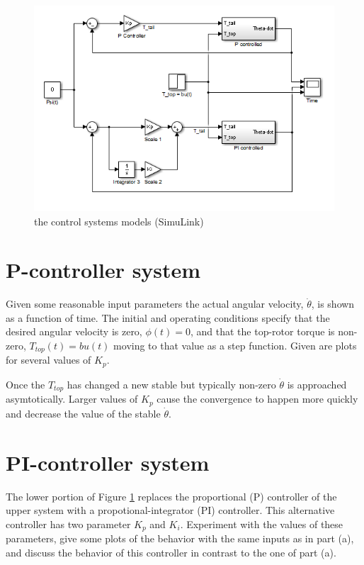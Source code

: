 \documentclass{article}
\begin{document}
\begin{figure}[h!]
\centering
\includegraphics[scale=0.8]{controller_model.png}
\caption{the control systems models (SimuLink)}
\label{fig:control_system}
\end{figure}

\section{P-controller system}

Given some reasonable input parameters the
actual angular velocity, $\dot{\theta}$, is shown
as a function of time.
The initial and operating conditions
specify that the desired angular velocity
is zero, $\phi (t) = 0$, and that the
top-rotor torque is non-zero,
$T_{top}(t) = b u(t)$ moving to that
value as a step function.
Given are plots for several values of $K_p$.


Once the $T_{top}$ has changed a new stable but
typically non-zero $\dot{\theta}$ is approached asymtotically.
Larger values of $K_p$ cause the convergence
to happen more quickly and decrease the value of
the stable $\dot{\theta}$.


\section{PI-controller system}
The lower portion of Figure \ref{fig:control_system}
replaces the proportional (P) controller of the upper system
with a propotional-integrator (PI) controller.
This alternative controller has two parameter $K_p$ and $K_i$.
Experiment with the values of these parameters,
give some plots of the behavior with the
same inputs as in part (a), and discuss the
behavior of this controller in contrast
to the one of part (a).
\end{document}
